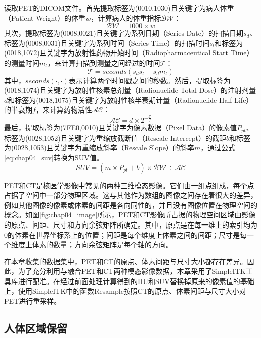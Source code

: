 读取PET的DICOM文件。首先提取标签为(0010,1030)且关键字为病人体重（Patient Weight）的体重\(w\)，计算病人的体重指标\(\mathcal{BW}\)：
\begin{equation}
    \mathcal{BW} = 1000 \times w
\end{equation}
其次，提取标签为(0008,0021)且关键字为系列日期（Series Date）的扫描日期\(s_d\)、标签为(0008,0031)且关键字为系列时间（Series Time）的扫描时间\(s_t\)和标签为(0018,1072)且关键字为放射性药物开始时间（Radiopharmaceutical Start Time）的测量时间\(m_t\)，来计算扫描到测量之间经过的时间\(\mathcal{T}\)：
\begin{equation}
    \mathcal{T} = seconds(s_ds_t - s_dm_t)
\end{equation}
其中，\(seconds(\cdot, \cdot)\)表示计算两个时间戳之间的秒数。然后，提取标签为(0018,1074)且关键字为放射性核素总剂量（Radionuclide Total Dose）的注射剂量\(d\)和标签为(0018,1075)且关键字为放射性核半衰期计量（Radionuclide Half Life）的半衰期\(f\)，来计算药物活性\(\mathcal{AC}\)：
\begin{equation}
    \mathcal{AC} = d \times 2^{-\frac{\mathcal{T}}{f}}
\end{equation}
最后，提取标签为(7FE0,0010)且关键字为像素数据（Pixel Data）的像素值\(P_{pt}\)、标签为(0028,1052)且关键字为重缩放截断值（Rescale Intercept）的截距\(b\)和标签为(0028,1053)且关键字为重缩放斜率（Rescale Slope）的斜率\(m\)，通过公式\ref{eq:chap04_suv}转换为SUV值。
\begin{equation}
    SUV = (m \times P_{pt} + b) \times \mathcal{BW} \div \mathcal{AC}
    \label{eq:chap04_suv}
\end{equation}

PET和CT是核医学影像中常见的两种三维模态影像。它们由一组点组成，每个点占据了空间中一部分物理区域。这与其他作为数组的图像之间存在着很大的差异，例如其他图像的像素或体素的间距是各向同性的，并且没有图像位置在物理空间的概念。如图\ref{fig:chap04_image}所示，PET和CT影像所占据的物理空间区域由影像的原点、间距、尺寸和方向余弦矩阵所确定。其中，原点是在每一维上的索引均为0的体素在世界坐标系上的位置；间距是每个维度上体素之间的间距；尺寸是每一个维度上体素的数量；方向余弦矩阵是每个轴的方向。

在本章收集的数据集中，PET和CT的原点、体素间距与尺寸大小都存在差异。因此，为了充分利用与融合PET和CT两种模态影像数据，本章采用了SimpleITK工具库\cite{yaniv2018simpleitk}进行配准。在经过前面处理计算得到的HU和SUV替换掉原来的像素值的基础上，使用SimpleITK中的函数Resample按照CT的原点、体素间距与尺寸大小对PET进行重采样。

\subsection{人体区域保留}

